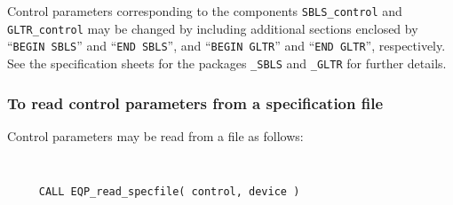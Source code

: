 \documentclass{galahad}
\begin{document}
Control parameters corresponding to the components 
{\tt SBLS\_control}
and
{\tt GLTR\_control} may be changed by including additional sections enclosed by
``{\tt BEGIN SBLS}'' and 
``{\tt END SBLS}'', and
``{\tt BEGIN GLTR}'' and 
``{\tt END GLTR}'', respectively. 
See the specification sheets for the packages 
{\tt \libraryname\_SBLS} 
and
{\tt \libraryname\_GLTR}
for further details.

\subsubsection{To read control parameters from a specification file}
\label{readspec}

Control parameters may be read from a file as follows:
\hskip0.5in 

\def\baselinestretch{0.8}
{\tt 
\begin{verbatim}
     CALL EQP_read_specfile( control, device )
\end{verbatim}
}
\def\baselinestretch{1.0}
\end{document}
